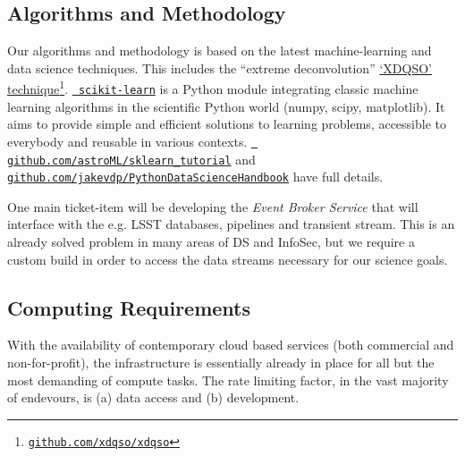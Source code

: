 \documentclass[oneside, a4paper, onecolumn, 11pt]{article}
\begin{document}
\subsection*{Algorithms and Methodology}
Our algorithms and methodology is based on the latest machine-learning and data science techniques. 
This includes the ``extreme deconvolution'' \href{http://www.sdss.org/dr14/data\_access/value-added-catalogs/?vac\_id=xdqso/}{`XDQSO' technique}\footnote{\href{https://github.com/xdqso/xdqso}{\tt github.com/xdqso/xdqso}}.
\href{http://ogrisel.github.io/scikit-learn.org/sklearn-tutorial/index.html}{\tt
scikit-learn} is a Python module integrating classic machine learning
algorithms in the scientific Python world (numpy, scipy,
matplotlib). It aims to provide simple and efficient solutions to
learning problems, accessible to everybody and reusable in various
contexts.  \href{https://github.com/astroML/sklearn\_tutorial}{{\tt
github.com/astroML/sklearn\_tutorial}} and \href{https://github.com/jakevdp/PythonDataScienceHandbook}{{\tt github.com/jakevdp/PythonDataScienceHandbook}} have full details.


\smallskip
\smallskip
\noindent
One main ticket-item will be developing the {\it Event Broker Service}
that will interface with the e.g. LSST databases, pipelines and
transient stream. This is an already solved problem in many areas 
of DS and InfoSec, but we require a custom build in order to access 
the data streams necessary for our science goals. 


\subsection*{Computing Requirements}
With the availability of contemporary cloud based services (both
commercial and non-for-profit), the infrastructure is essentially
already in place for all but the most demanding of compute tasks. The
rate limiting factor, in the vast majority of endevours, is (a) data
access and (b) development.
\end{document}
